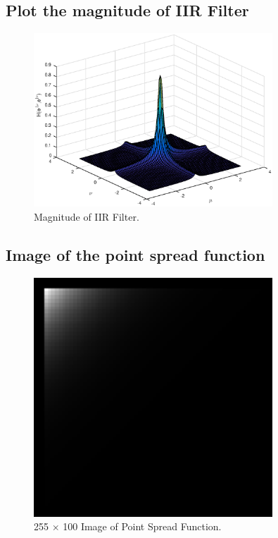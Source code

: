 \documentclass{article}
\begin{document}
\subsection{Plot the magnitude of IIR Filter}
\begin{figure}[h]
\begin{center}
\includegraphics[width=0.8\textwidth]{iircsft}
\caption{Magnitude of IIR Filter.}
\end{center}
\end{figure}

\pagebreak

\subsection{Image of the point spread function}
\begin{figure}[h]
\begin{center}
\includegraphics[width=0.8\textwidth]{hout}
\caption{255 $\times$ 100 Image of Point Spread Function.}
\end{center}
\end{figure}
\end{document}
